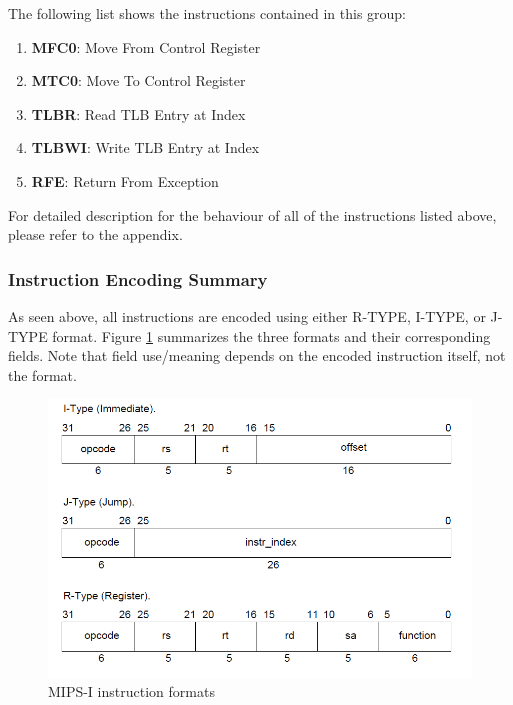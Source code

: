 \documentclass[]{scrartcl}
\begin{document}
The following list shows the instructions contained in this group:

\begin{enumerate}

\item \textbf{MFC0}:  Move From Control Register
\item \textbf{MTC0}:  Move To Control Register
\item \textbf{TLBR}:  Read TLB Entry at Index
\item \textbf{TLBWI}: Write TLB Entry at Index
\item \textbf{RFE}:   Return From Exception

\end{enumerate}

For detailed description for the behaviour of all of the instructions listed
above, please refer to the appendix.

\subsubsection{Instruction Encoding Summary}

As seen above, all instructions are encoded using either R-TYPE, I-TYPE,
or J-TYPE format. Figure \ref{formats} summarizes the three formats and their
corresponding fields. Note that field use/meaning depends on the
encoded instruction itself, not the format.\\

\begin{figure}[H]
\begin{center}
\includegraphics[width=\textwidth]{formats.png}
\end{center}
\caption{MIPS-I instruction formats}
\label{formats}
\end{figure}
\end{document}

